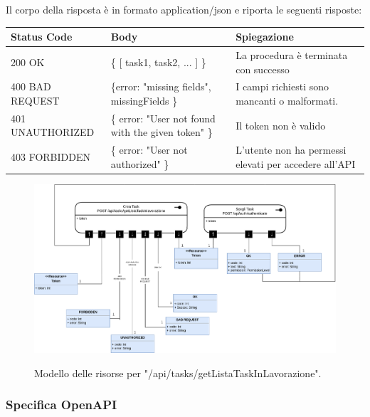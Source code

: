 \documentclass{report}
\begin{document}
Il corpo della risposta è in formato application/json e riporta le seguenti risposte:

\begin{center} %
	\centering
	\begin{tabular}{ |p{4cm}|p{4cm}|p{4cm}| }
		\hline
		\centering Status Code & \qquad\qquad\quad Body & \qquad\quad Spiegazione\\ %
		\hline
		200 OK & \{ [ task1, task2, ... ] \}  & La procedura è terminata con successo	\\ 
		\hline
		400 BAD REQUEST & \{error: "missing fields", missingFields \} & I campi richiesti sono mancanti o malformati. \\
		\hline
		401 UNAUTHORIZED & \{ error: "User not found with the given token" \} & Il token non è valido \\
		\hline
		403 FORBIDDEN & \{ error: "User not authorized" \} &  L'utente non ha permessi elevati per accedere all'API \\
		\hline
	\end{tabular}
\end{center}

\begin{figure}[H]
	\centering\includegraphics[width=1\textwidth]{images/model_in_lavorazione.png}
	
	Modello delle risorse per "/api/tasks/getListaTaskInLavorazione".
\end{figure}

\subsubsection*{Specifica OpenAPI}
\end{document}
